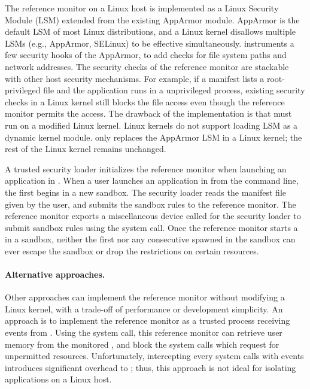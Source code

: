 The reference monitor on a Linux host
is implemented as a Linux Security Module (LSM) extended from the existing AppArmor module.
AppArmor is the default LSM of most Linux distributions,
and a Linux kernel disallows multiple LSMs (e.g., AppArmor, SELinux) to be effective simultaneously.
\graphene{} instruments
a few security hooks of the AppArmor, to add checks for file system paths
and network addresses.
The security checks of the reference monitor are stackable with other host security mechanisms.
For example, if a manifest lists a root-privileged file and the \graphene{} application runs in a unprivileged process,
existing security checks in a Linux kernel
still blocks the file access even though the reference monitor permits the access.
The drawback of the implementation
is that \graphene{} must run on a modified Linux kernel.
Linux kernels do not support loading LSM as a dynamic kernel module.
\graphene{} only replaces
the AppArmor LSM in a Linux kernel; the rest of the Linux kernel remains unchanged.


A trusted security loader initializes the reference monitor
when launching an application in \graphene{}.
When a user launches an application in \graphene{} from the command line,
the first \picoproc{} begins in a new sandbox.
The security loader
reads the manifest file given by the user,
and submits the sandbox rules to the reference monitor.
The reference monitor exports a miscellaneous device called 
for the security loader to submit sandbox rules using the  system call.
Once the reference monitor
starts a \picoproc{} in a sandbox, neither the first \picoproc{} nor any consecutive \picoprocs{} spawned in the sandbox can ever escape the sandbox or drop the restrictions on certain resources.


\paragraph{Alternative approaches.}
Other approaches can implement the reference monitor without modifying a Linux kernel, with a trade-off of performance or development simplicity.
An approach is to implement the reference monitor as a trusted process receiving  events from \graphene{} \picoprocs{}.
Using the  system call, this reference monitor can retrieve user memory from the monitored \picoprocs{},
and block the system calls which request for unpermitted resources.
Unfortunately, intercepting every system calls with  events introduces significant overhead to \hostapis{};
thus, this approach is not ideal for isolating \graphene{} applications on a Linux host.


